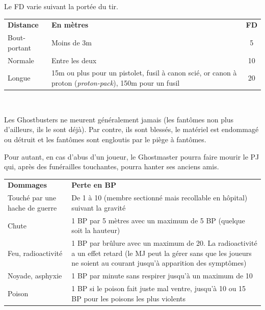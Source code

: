 \begin{frame}[b]
{\begin{minipage}[c][0.95\textheight][c]{\linewidth}


\myindent Le FD varie suivant la portée du tir.

\begin{center}
\begin{tabular}{l p{5.5cm} c}
\textbf{Distance} & \textbf{En mètres} & \textbf{FD} \\
Bout-portant & Moins de 3m & 5 \\
Normale & Entre les deux & 10 \\ 
Longue & 15m ou plus pour un pistolet, fusil à canon scié, or canon à proton (\textit{proton-pack}), 150m pour un fusil &  20 \\
\end{tabular} \\
\end{center}


\myindent Les Ghostbusters ne meurent généralement jamais (les fantômes non plus d'ailleurs, ils le sont déjà). Par contre, ils sont blessés, le matériel est endommagé ou détruit et les fantômes sont engloutis par le piège à fantômes.

\myindent Pour autant, en cas d'abus d'un joueur, le Ghostmaster pourra faire mourir le PJ qui, après des funérailles touchantes, pourra hanter ses anciens amis.

\begin{center}
\begin{tabular}{>{\raggedright\arraybackslash}p{2cm} p{6cm}}
\textbf{Dommages} & \textbf{Perte en BP}\\
Touché par une hache de guerre & De 1 à 10 (membre sectionné mais recollable en hôpital) suivant la gravité \\
Chute & 1 BP par 5 mètres avec un maximum de 5 BP (quelque soit la hauteur) \\
Feu, radioactivité & 1 BP par brûlure avec un maximum de 20. La radioactivité a un effet retard (le MJ peut la gérer sans que les joueurs ne soient au courant jusqu'à apparition des symptômes) \\
Noyade, asphyxie & 1 BP par minute sans respirer jusqu'à un maximum de 10 \\
Poison & 1 BP si le poison fait juste mal ventre, jusqu'à 10 ou 15 BP pour les poisons les plus violents \\
\end{tabular}
\end{center}

\end{minipage}
}
\end{frame}

